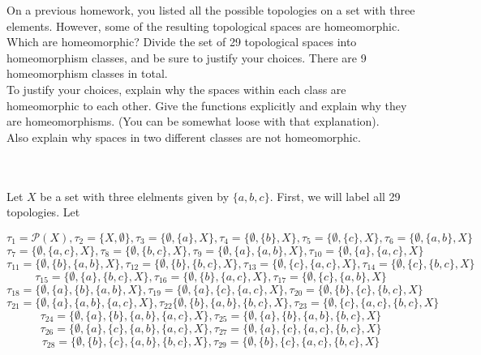 On a previous homework, you listed all the possible topologies on a set with three elements.
However, some of the resulting topological spaces are homeomorphic. Which are homeomorphic? Divide the
set of 29 topological spaces into homeomorphism classes, and be sure to justify your choices. There are
9 homeomorphism classes in total.\\
To justify your choices, explain why the spaces within each class are homeomorphic to each other. Give
the functions explicitly and explain why they are homeomorphisms.
(You can be somewhat loose with that explanation).\\
Also explain why spaces in two different classes are not homeomorphic.\\\\

\begin{solution}\renewcommand{\qedsymbol}{}\ \\
    Let $X$ be a set with three elelments given by $\{a,b,c\}$. First, we will label all 29 topologies.
    Let
    
    $$\tau_1=\mathcal{P}(X), \tau_2=\{X,\emptyset\}, \tau_3=\{\emptyset, \{a\}, X\},
    \tau_4=\{\emptyset, \{b\}, X\}, \tau_5=\{\emptyset, \{c\}, X\}, \tau_6=\{\emptyset, \{a,b\}, X\}$$
    $$\tau_7=\{\emptyset, \{a,c\}, X\}, \tau_8=\{\emptyset, \{b,c\}, X\},
    \tau_9=\{\emptyset, \{a\}, \{a,b\}, X\}, \tau_{10}=\{\emptyset, \{a\}, \{a,c\}, X\}$$
    $$\tau_{11}=\{\emptyset, \{b\}, \{a,b\}, X\}, \tau_{12}=\{\emptyset, \{b\}, \{b,c\}, X\},
    \tau_{13}=\{\emptyset, \{c\}, \{a,c\}, X\}, \tau_{14}=\{\emptyset, \{c\}, \{b,c\}, X\}$$
    $$\tau_{15}=\{\emptyset, \{a\}, \{b,c\}, X\}, \tau_{16}=\{\emptyset, \{b\}, \{a,c\}, X\},
    \tau_{17}=\{\emptyset, \{c\}, \{a,b\}, X\}$$
    $$\tau_{18}=\{\emptyset, \{a\}, \{b\}, \{a,b\}, X\},
    \tau_{19}=\{\emptyset, \{a\}, \{c\}, \{a,c\}, X\},
    \tau_{20}=\{\emptyset, \{b\}, \{c\}, \{b,c\}, X\}$$
    $$\tau_{21}=\{\emptyset, \{a\}, \{a,b\}, \{a,c\}, X\},
    \tau_{22}\{\emptyset, \{b\}, \{a,b\}, \{b,c\}, X\},
    \tau_{23}=\{\emptyset, \{c\}, \{a,c\}, \{b,c\}, X\}$$
    $$\tau_{24}=\{\emptyset, \{a\}, \{b\}, \{a,b\}, \{a,c\}, X\},
    \tau_{25}=\{\emptyset, \{a\}, \{b\}, \{a,b\}, \{b,c\}, X\}$$
    $$\tau_{26}=\{\emptyset, \{a\}, \{c\}, \{a,b\}, \{a,c\}, X\},
    \tau_{27}=\{\emptyset, \{a\}, \{c\}, \{a,c\}, \{b,c\}, X\}$$
    $$\tau_{28}=\{\emptyset, \{b\}, \{c\}, \{a,b\}, \{b,c\}, X\},
    \tau_{29}=\{\emptyset, \{b\}, \{c\}, \{a,c\}, \{b,c\}, X\}$$


\end{solution}
